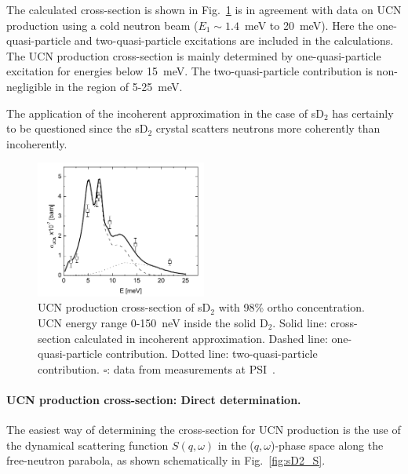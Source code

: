 The calculated cross-section is shown in
Fig.~\ref{fig:Frei2010_sigma_G1} is in agreement with data on UCN
production using a cold neutron beam ($E_1 \sim 1.4$~meV to 20~meV).
Here the one-quasi-particle and two-quasi-particle excitations are
included in the calculations.  The UCN production cross-section is
mainly determined by one-quasi-particle excitation for energies below
15~meV. The two-quasi-particle contribution is non-negligible in the
region of 5-25~meV.

The application of the incoherent approximation in the case of sD$_2$
has certainly to be questioned since the sD$_2$ crystal scatters
neutrons more coherently than incoherently.

\begin{figure}[h!]
\begin{center}
   \includegraphics[width=0.5\textwidth]{Frei2010_sigma_G1.PNG} \caption{UCN
    production cross-section of sD$_2$ with 98\% ortho
    concentration. UCN energy range 0-150~neV inside the solid
    D$_2$. Solid line: cross-section calculated in incoherent
    approximation. Dashed line: one-quasi-particle
    contribution. Dotted line: two-quasi-particle
    contribution. $\square$: data from measurements at
    PSI~\cite{Atchison2007}.  }
    \label{fig:Frei2010_sigma_G1}
    \end{center}
\end{figure} 




\paragraph{UCN production cross-section: Direct determination.}
The easiest way of determining the cross-section for UCN production is
the use of the dynamical scattering function $S(q,\omega)$ in the
($q,\omega$)-phase space along the free-neutron parabola, as shown
schematically in Fig.~\ref{fig:sD2_S}.

